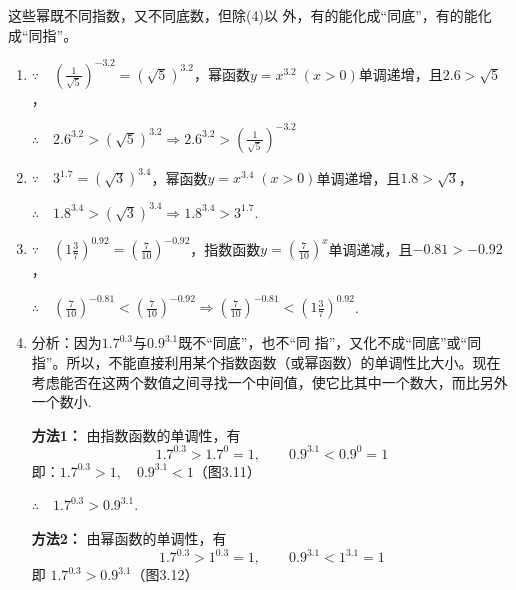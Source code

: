  \begin{analyze}
     这些幂既不同指数，又不同底数，但除(4)以
 外，有的能化成“同底”，有的能化成“同指”。
 \end{analyze}
 
 \begin{solution}
 \begin{enumerate}[(1)]
     \item $\because\quad \left(\frac{1}{\sqrt{5}}\right)^{-3.2}=(\sqrt{5})^{3.2}$，幂函数$y=x^{3.2}\; (x>0)$单调递增，且$2.6>\sqrt{5}$，
     
 $\therefore\quad 2.6^{3.2}>\left ({\sqrt {5}}\right ) ^{3.2}\Longrightarrow 2.6^{3.2}>\left ( \frac 1{\sqrt {5}}\right ) ^{- 3.2}$
 
 \item $\because\quad 3^{1.7}=\left(\sqrt{3}\right)^{3.4}$，幂函数$y=x^{3.4}\; (x>0)$单调递增，且$1.8>\sqrt{3}$，
 
 $\therefore\quad 1.8^{3.4}>\left ({\sqrt {3}}\right ) ^{3.4}\Longrightarrow 1.8^{3.4}>3^{1.7}$.
 
 \item $\because\quad \left(1\frac{3}{7}\right)^{0.92}=\left(\frac{7}{10}\right)^{-0.92}$，指数函数$y=\left(\frac{7}{10}\right)^x$单调递减，且$-0.81>-0.92$，
 
 $\therefore\quad \left(\frac{7}{10}\right)^{-0.81}<\left(\frac{7}{10}\right)^{-0.92}\Longrightarrow \left(\frac{7}{10}\right)^{-0.81}<\left(1\frac{3}{7}\right)^{0.92}$.
 
 \item 分析：因为$1.7^{0.3}$与$0.9^{3.1}$既不“同底”，也不“同
 指”，又化不成“同底”或“同指”。所以，不能直接利用某个指数函数（或幂函数）的单调性比大小。现在考虑能否在这两个数值之间寻找一个中间值，使它比其中一个数大，而比另外一个数小.
 
 \textbf{方法1：} 由指数函数的单调性，有
 \[1.7^{0.3}>1.7^0=1,\qquad 0.9^{3.1}<0.9^0=1\]
 即：$1.7^{0.3}>1,\quad 0.9^{3.1}<1$\hfill （图3.11）
 
 $\therefore\quad 1.7^{0.3}>0.9^{3.1}$.
 
 \textbf{方法2：} 由幂函数的单调性，有
 \[1.7^{0.3}>1^{0.3}=1,\qquad 0.9^{3.1}<1^{3.1}=1\]
 即
 $1.7^{0.3}>0.9^{3.1}$\hfill （图3.12）
 \end{enumerate}
 \end{solution}
 
